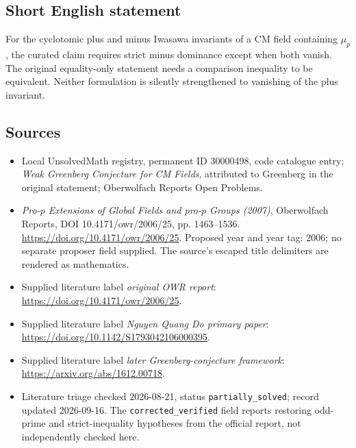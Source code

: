 \documentclass[11pt]{article}
\begin{document}
\subsection{Short English statement}
For the cyclotomic plus and minus Iwasawa invariants of a CM field containing \(\mu_p\), the curated claim requires strict minus dominance except when both vanish. The original equality-only statement needs a comparison inequality to be equivalent. Neither formulation is silently strengthened to vanishing of the plus invariant.
\subsection{Sources}
\begin{itemize}\item Local UnsolvedMath registry, permanent ID 30000498, code catalogue entry; \emph{Weak Greenberg Conjecture for CM Fields}, attributed to Greenberg in the original statement; Oberwolfach Reports Open Problems.\item \emph{Pro-\(p\) Extensions of Global Fields and pro-\(p\) Groups (2007)}, Oberwolfach Reports, DOI 10.4171/owr/2006/25, pp. 1463--1536. \url{https://doi.org/10.4171/owr/2006/25}. Proposed year and year tag: 2006; no separate proposer field supplied. The source's escaped title delimiters are rendered as mathematics.\item Supplied literature label \emph{original OWR report}: \url{https://doi.org/10.4171/owr/2006/25}.\item Supplied literature label \emph{Nguyen Quang Do primary paper}: \url{https://doi.org/10.1142/S1793042106000395}.\item Supplied literature label \emph{later Greenberg-conjecture framework}: \url{https://arxiv.org/abs/1612.00718}.\item Literature triage checked 2026-08-21, status \texttt{partially\_solved}; record updated 2026-09-16. The \texttt{corrected\_verified} field reports restoring odd-prime and strict-inequality hypotheses from the official report, not independently checked here.\end{itemize}
\end{document}
